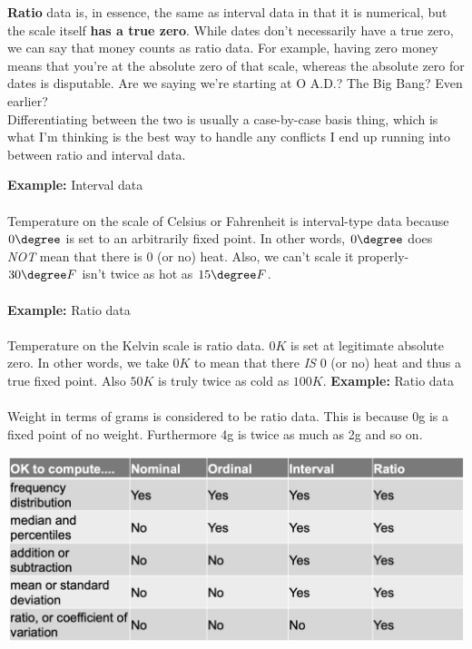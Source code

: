 \documentclass[english, 10pt]{article}
\begin{document}
\textbf{Ratio} data is, in essence, the same as interval data in that it is numerical, but the scale itself \textbf{has a true zero}. While dates don't necessarily have a true zero, we can say that money counts as ratio data. For example, having zero money means that you're at the absolute zero of that scale, whereas the absolute zero for dates is disputable. Are we saying we're starting at O A.D.? The Big Bang? Even earlier?\\

Differentiating between the two is usually a case-by-case basis thing, which is what I'm thinking is the best way to handle any conflicts I end up running into between ratio and interval data.\\

\begin{myproof}
\textbf{Example:} Interval data \\\\
Temperature on the scale of Celsius or Fahrenheit is interval-type data because $0\degree$ is set to an arbitrarily fixed point. In other words, $0\degree$ does \textit{NOT} mean that there is 0 (or no) heat. Also, we can't scale it properly- $30\degree F$ isn't twice as hot as $15\degree F$.\\\\
\textbf{Example:} Ratio data \\\\
Temperature on the Kelvin scale is ratio data. $0K$ is set at legitimate absolute zero. In other words, we take $0K$ to mean that there \textit{IS} 0 (or no) heat and thus a true fixed point. Also $50K$ is truly twice as cold as $100K$.
\textbf{Example:} Ratio data \\\\
Weight in terms of grams is considered to be ratio data. This is because 0g is a fixed point of no weight. Furthermore 4g is twice as much as 2g and so on.
\end{myproof}
\begin{center}
\includegraphics[scale=0.3]{img/Data_rules.png}
\end{center}
\end{document}
